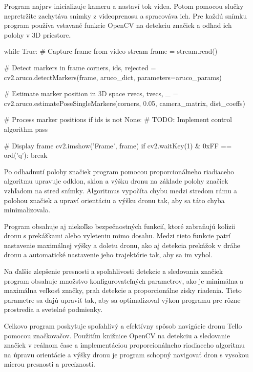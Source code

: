 Program najprv inicializuje kameru a nastaví tok videa. Potom pomocou slučky nepretržite zachytáva snímky z videoprenosu a spracováva ich. Pre každú snímku program používa vstavané funkcie OpenCV na detekciu značiek a odhad ich polohy v 3D priestore.
\begin{mypython}[caption={Detekcia značky a vypočítanie polohy},label=CL-4]
    while True:
    # Capture frame from video stream
    frame = stream.read()

    # Detect markers in frame
    corners, ids, rejected = cv2.aruco.detectMarkers(frame, aruco_dict, parameters=aruco_params)

    # Estimate marker position in 3D space
    rvecs, tvecs, _ = cv2.aruco.estimatePoseSingleMarkers(corners, 0.05, camera_matrix, dist_coeffs)

    # Process marker positions
    if ids is not None:
        # TODO: Implement control algorithm
        pass

    # Display frame
    cv2.imshow('Frame', frame)
    if cv2.waitKey(1) & 0xFF == ord('q'):
        break

\end{mypython}

Po odhadnutí polohy značiek program pomocou proporcionálneho riadiaceho algoritmu upravuje odklon, sklon a výšku dronu na základe polohy značiek vzhľadom na stred snímky. Algoritmus vypočíta chybu medzi stredom rámu a polohou značiek a upraví orientáciu a výšku dronu tak, aby sa táto chyba minimalizovala.

Program obsahuje aj niekoľko bezpečnostných funkcií, ktoré zabraňujú kolízii dronu s prekážkami alebo vyleteniu mimo dosahu. Medzi tieto funkcie patrí nastavenie maximálnej výšky a doletu dronu, ako aj detekcia prekážok v dráhe dronu a automatické nastavenie jeho trajektórie tak, aby sa im vyhol.

Na ďalšie zlepšenie presnosti a spoľahlivosti detekcie a sledovania značiek program obsahuje množstvo konfigurovateľných parametrov, ako je minimálna a maximálna veľkosť značky, prah detekcie a proporcionálne zisky riadenia. Tieto parametre sa dajú upraviť tak, aby sa optimalizoval výkon programu pre rôzne prostredia a svetelné podmienky.

Celkovo program poskytuje spoľahlivý a efektívny spôsob navigácie dronu Tello pomocou značkovačov. Použitím knižnice OpenCV na detekciu a sledovanie značiek v reálnom čase a implementáciou proporcionálneho riadiaceho algoritmu na úpravu orientácie a výšky dronu je program schopný navigovať dron s vysokou mierou presnosti a precíznosti.

